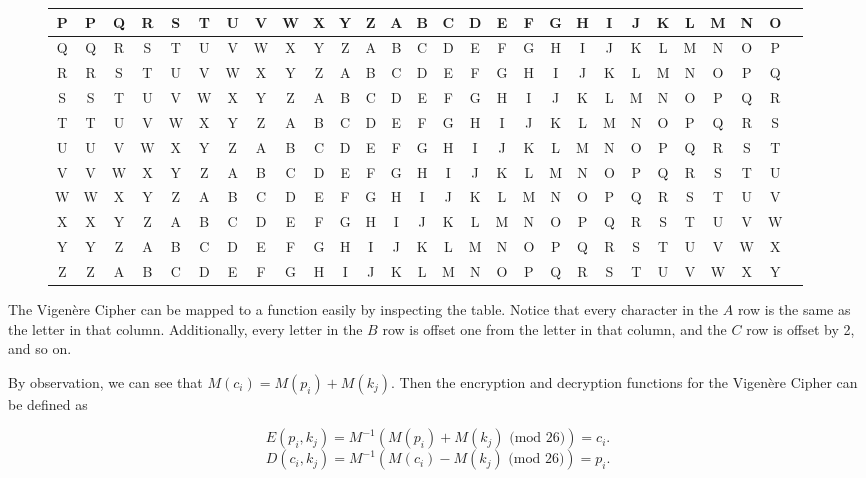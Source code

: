 \documentclass[12pt]{article}
\begin{document}
\begin{figure}[ht]
\begin{adjustbox}{max width=\textwidth}
\begin{tabular}{| c || c | c | c | c | c | c | c | c | c | c | c | c | c | c | c | c | c | c | c | c | c | c | c | c | c | c | c ||}
P & P & Q & R & S & T & U & V & W & X & Y & Z & A & B & C & D & E & F & G & H & I & J & K & L & M & N & O \\ \hline
Q & Q & R & S & T & U & V & W & X & Y & Z & A & B & C & D & E & F & G & H & I & J & K & L & M & N & O & P \\ \hline
R & R & S & T & U & V & W & X & Y & Z & A & B & C & D & E & F & G & H & I & J & K & L & M & N & O & P & Q \\ \hline
S & S & T & U & V & W & X & Y & Z & A & B & C & D & E & F & G & H & I & J & K & L & M & N & O & P & Q & R \\ \hline
T & T & U & V & W & X & Y & Z & A & B & C & D & E & F & G & H & I & J & K & L & M & N & O & P & Q & R & S \\ \hline
U & U & V & W & X & Y & Z & A & B & C & D & E & F & G & H & I & J & K & L & M & N & O & P & Q & R & S & T \\ \hline
V & V & W & X & Y & Z & A & B & C & D & E & F & G & H & I & J & K & L & M & N & O & P & Q & R & S & T & U \\ \hline
W & W & X & Y & Z & A & B & C & D & E & F & G & H & I & J & K & L & M & N & O & P & Q & R & S & T & U & V \\ \hline
X & X & Y & Z & A & B & C & D & E & F & G & H & I & J & K & L & M & N & O & P & Q & R & S & T & U & V & W \\ \hline
Y & Y & Z & A & B & C & D & E & F & G & H & I & J & K & L & M & N & O & P & Q & R & S & T & U & V & W & X \\ \hline
Z & Z & A & B & C & D & E & F & G & H & I & J & K & L & M & N & O & P & Q & R & S & T & U & V & W & X & Y \\ \hline
	\end{tabular}
\end{adjustbox}


\end{figure}

The Vigen\`{e}re Cipher can be mapped to a function easily by inspecting the table. Notice that every character in the $A$ row is the same as the letter in that column. Additionally, every letter in the $B$ row is offset one from the letter in that column, and the $C$ row is offset by 2, and so on.

By observation, we can see that $M(c_i)=M(p_i)+M(k_j)$. Then the encryption and decryption functions for the Vigen\`{e}re Cipher can be defined as 

$$E(p_i, k_j)=M^{-1}(M(p_i)+M(k_j)\text{ (mod 26)})=c_i.$$
$$D(c_i, k_j)=M^{-1}(M(c_i)-M(k_j)\text{ (mod 26)})=p_i.$$
\end{document}
